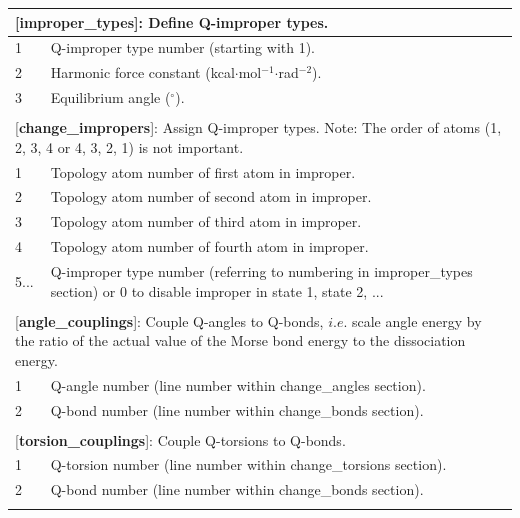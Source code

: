 \documentclass[10pt,oneside,pdftex]{article}
\begin{document}
\begin{longtable}{|p{53pt}|p{181pt}|p{160pt}|}
\multicolumn{3}{p{394pt}}{[\textbf{improper\_types}]: Define Q-improper types.}\\
\hline 1 & \multicolumn{2}{p{341pt}|}{Q-improper type number (starting with 1).}\\
\hline 2 & \multicolumn{2}{p{341pt}|}{Harmonic force constant (kcal$\cdot$mol$^{-1}$$\cdot$rad$^{-2}$).}\\
\hline 3 & \multicolumn{2}{p{341pt}|}{Equilibrium angle ($^{\circ}$).}\\
\hline
\multicolumn{3}{p{394pt}}{}\\

\multicolumn{3}{p{394pt}}{[\textbf{change\_impropers}]: Assign Q-improper types. Note: The order of atoms (1, 2, 3, 4 or 4, 3, 2, 1) is not important.}\\
\hline 1 & \multicolumn{2}{p{341pt}|}{Topology atom number of first atom in improper.}\\
\hline 2 & \multicolumn{2}{p{341pt}|}{Topology atom number of second atom in improper.}\\
\hline 3 & \multicolumn{2}{p{341pt}|}{Topology atom number of third atom in improper.}\\
\hline 4 & \multicolumn{2}{p{341pt}|}{Topology atom number of fourth atom in improper.}\\
\hline 5... & \multicolumn{2}{p{341pt}|}{Q-improper type number (referring to numbering in improper\_types section) or 0 to disable improper in state 1, state 2, ...}\\
\hline
\multicolumn{3}{p{394pt}}{}\\

\multicolumn{3}{p{394pt}}{[\textbf{angle\_couplings}]: Couple Q-angles to Q-bonds, $i.e.$ scale angle energy by the ratio of the actual value of the Morse bond energy to the dissociation energy.}\\
\hline 1 & \multicolumn{2}{p{341pt}|}{Q-angle number (line number within change\_angles section).}\\
\hline 2 & \multicolumn{2}{p{341pt}|}{Q-bond number (line number within change\_bonds section).}\\
\hline
\multicolumn{3}{p{394pt}}{}\\

\multicolumn{3}{p{394pt}}{[\textbf{torsion\_couplings}]: Couple Q-torsions to Q-bonds.}\\
\hline 1 & \multicolumn{2}{p{341pt}|}{Q-torsion number (line number within change\_torsions section).}\\
\hline 2 & \multicolumn{2}{p{341pt}|}{Q-bond number (line number within change\_bonds section).}\\
\hline
\multicolumn{3}{p{394pt}}{}\\


\end{longtable}
\end{document}

